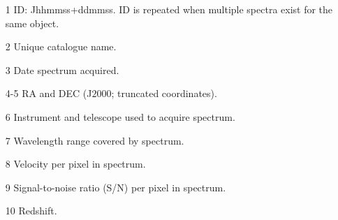 \begin{itemize}

\item[1] ID: Jhhmmss+ddmmss. ID is repeated when multiple spectra exist for the same object. 

\item[2] Unique catalogue name.   

\item[3] Date spectrum acquired. 

\item[4-5] RA and DEC (J$2000$; truncated coordinates).  

\item[6] Instrument and telescope used to acquire spectrum. 

\item[7] Wavelength range covered by spectrum. 

\item[8] Velocity per pixel in spectrum. 

\item[9] Signal-to-noise ratio (S/N) per pixel in spectrum. 

\item[10] Redshift. 

\end{itemize}


